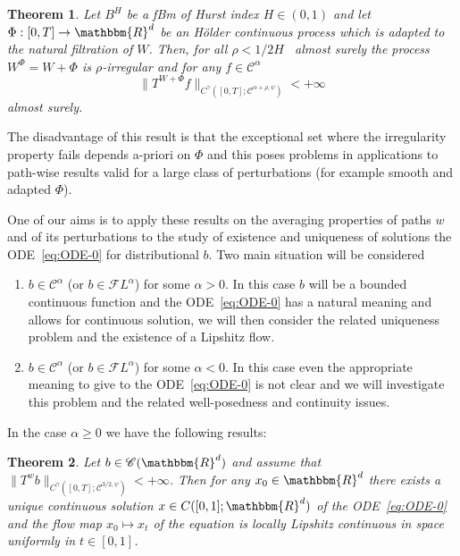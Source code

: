 \documentclass[a4paper,11pt]{article}
\newenvironment{enumeratenumeric}{\begin{enumerate}[1.] }{\end{enumerate}}
\newtheorem{theorem}{Theorem}[section]
\newcommand{\CC}{\mathscr C}
\newcommand{\CF}{\mathscr F}
\begin{document}
\begin{theorem}
  \label{th:perturbed-girsanov}Let $B^{H}$ be a fBm of Hurst index $H \in (
  0,1 )$ and let $\Phi : [ 0,T ] \rightarrow \mathbbm{R}^{d}$ be an H\"older
  continuous process which is adapted to the natural filtration of $W$. Then,
  for all $\rho <1/2H$ \ almost surely the process $W^{\Phi} =W+ \Phi$ is
  $\rho$-irregular and for any $f \in \CC^{\alpha}$
  \[ \| T^{W+ \Phi}_{} f \|_{C^{\gamma} \left( [ 0,T ] ; \CC^{\alpha + \rho ,
     \psi} \right)} <+ \infty \]
  almost surely. \ 
\end{theorem}

The disadvantage of this result is that the exceptional set where the
irregularity property fails depends a-priori on $\Phi$ and this poses problems
in applications to path-wise results valid for a large class of perturbations
(for example smooth and adapted $\Phi$).



One of our aims is to apply these results on the averaging properties of
paths $w$ and of its perturbations to the study of existence and uniqueness of
solutions the ODE~{\eqref{eq:ODE-0}} for distributional $b$. Two main
situation will be considered
\begin{enumeratenumeric}
  \item $b \in \CC^{\alpha}$ (or $b \in \CF L^{\alpha}$) for some $\alpha >0$.
  In this case $b$ will be a bounded continuous function and the
  ODE~{\eqref{eq:ODE-0}} has a natural meaning and allows for continuous
  solution, we will then consider the related uniqueness problem and the
  existence of a Lipshitz flow.
  
  \item $b \in \CC^{\alpha}$ (or $b \in \CF L^{\alpha}$) for some $\alpha <0$.
  In this case even the appropriate meaning to give to the
  ODE~{\eqref{eq:ODE-0}} is not clear and we will investigate this problem and
  the related well-posedness and continuity issues.
\end{enumeratenumeric}
In the case $\alpha \geqslant 0$ we have the following results:

\begin{theorem}
  \label{th:ode-flow-0}Let $b \in \CC ( \mathbbm{R}^{d} )$ and assume that
  $\|T^{w} b\|_{C^{\gamma} ( [ 0,T ] ; \CC^{3/2, \psi} )} <+ \infty$. Then for
  any $x_{0} \in \mathbbm{R}^{d}$ there exists a unique continuous solution $x
  \in C ([0,1];\mathbbm{R}^{d} )$ of the ODE~{\eqref{eq:ODE-0}} and the flow
  map $x_{0} \mapsto x_{t}$ of the equation is locally Lipshitz continuous in
  space uniformly in $t \in [0,1]$.
\end{theorem}
\end{document}
